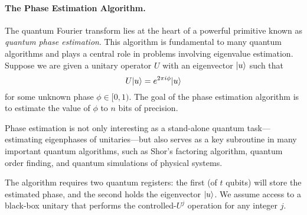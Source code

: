 \documentclass[12pt]{report}
\begin{document}
\paragraph{The Phase Estimation Algorithm.}

The quantum Fourier transform lies at the heart of a powerful primitive known as \emph{quantum phase estimation}. This algorithm is fundamental to many quantum algorithms and plays a central role in problems involving eigenvalue estimation. Suppose we are given a unitary operator $U$ with an eigenvector $\lvert u\rangle$ such that
\[
U \lvert u\rangle = e^{2\pi i \phi} \lvert u\rangle
\]
for some unknown phase $\phi \in [0, 1)$. The goal of the phase estimation algorithm is to estimate the value of $\phi$ to $n$ bits of precision.

Phase estimation is not only interesting as a stand-alone quantum task—estimating eigenphases of unitaries—but also serves as a key subroutine in many important quantum algorithms, such as Shor’s factoring algorithm, quantum order finding, and quantum simulations of physical systems.

The algorithm requires two quantum registers: the first (of $t$ qubits) will store the estimated phase, and the second holds the eigenvector $\lvert u\rangle$. We assume access to a black-box unitary that performs the controlled-$U^j$ operation for any integer $j$.
\end{document}
